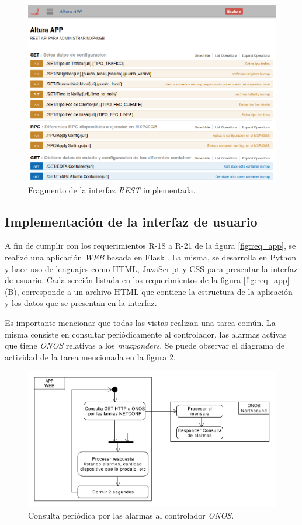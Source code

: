 \begin{figure}[H]
    \centering
    \includegraphics[scale=0.41]{Figures/captura-rest.png}
    \caption{Fragmento de la interfaz \textit{REST} implementada.}
    \label{fig:rest_capt}
  \end{figure}


  \subsection{Implementación de la interfaz de usuario}
  A fin de cumplir con los requerimientos R-18 a R-21 de la figura \ref{fig:req_app}, se realizó una aplicación \textit{WEB} basada en Flask \parencite{flask}. La misma, se desarrolla en Python y hace uso de lenguajes como HTML, JavaScript y CSS para presentar la interfaz de usuario. Cada sección listada en los requerimientos de la figura \ref{fig:req_app} (B), corresponde a un archivo HTML que contiene la estructura de la aplicación y los datos que se presentan en la interfaz. 

Es importante mencionar que todas las vistas realizan una tarea común. La misma consiste en consultar periódicamente al controlador, las alarmas activas que tiene \textit{ONOS} relativas a los \textit{muxponders}. Se puede observar el diagrama de actividad de la tarea mencionada en la figura \ref{fig:consulta_alarmas}.

\begin{figure}[H]
    \centering
    \includegraphics[scale=0.45]{Figures/consulta_alarmas.pdf}
    \caption{Consulta periódica por las alarmas al controlador \textit{ONOS}.}
    \label{fig:consulta_alarmas}
  \end{figure}

